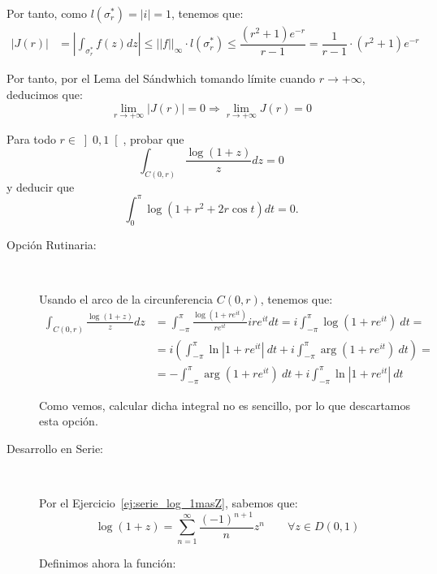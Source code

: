 \begin{ejercicio}
    Por tanto, como $l(\sigma_r^*)=|i|=1$, tenemos que:
    \begin{align*}
        |J(r)| &= \left|\int_{\sigma_r^*} f(z)dz\right| \leq ||f||_\infty\cdot l(\sigma_r^*) \leq \dfrac{(r^2+1)e^{-r}}{r-1}
        = \dfrac{1}{r-1}\cdot (r^2+1)e^{-r}
    \end{align*}

    Por tanto, por el Lema del Sándwhich tomando límite cuando $r \to +\infty$, deducimos que:
    \begin{equation*}
        \lim_{r\to+\infty} |J(r)| = 0
        \Longrightarrow \lim_{r\to+\infty} J(r) = 0
    \end{equation*}
\end{ejercicio}

\begin{ejercicio}
    Para todo $r \in \left]0,1\right[$, probar que
    \[
        \int_{C(0,r)} \frac{\log(1+z)}{z}dz = 0
    \]
    y deducir que
    \[
        \int_{0}^{\pi} \log(1+r^2 + 2r\cos t)dt = 0.
    \]

    \begin{description}
        \item[Opción Rutinaria:]~
        
        Usando el arco de la circunferencia $C(0,r)$, tenemos que:
        \begin{align*}
            \int_{C(0,r)} \frac{\log(1+z)}{z}dz &= \int_{-\pi}^{\pi} \frac{\log(1+re^{it})}{re^{it}}ire^{it}dt
            = i\int_{-\pi}^{\pi} \log(1+re^{it})\ dt
            =\\&= i\left(\int_{-\pi}^{\pi} \ln|1+re^{it}|\ dt + i\int_{-\pi}^{\pi} \arg(1+re^{it})\ dt\right)
            =\\&= -\int_{-\pi}^{\pi} \arg(1+re^{it})\ dt + i\int_{-\pi}^{\pi} \ln|1+re^{it}|\ dt
        \end{align*}

        Como vemos, calcular dicha integral no es sencillo, por lo que descartamos esta opción.

        \item[Desarrollo en Serie:]~
        
        Por el Ejercicio~\ref{ej:serie_log_1masZ}, sabemos que:
        \begin{equation*}
            \log(1+z) = \sum\limits_{n= 1}^\infty \dfrac{(-1)^{n+1}}{n}z^n\qquad \forall z \in D(0,1)
        \end{equation*}

        Definimos ahora la función:


\end{description}
\end{ejercicio}
